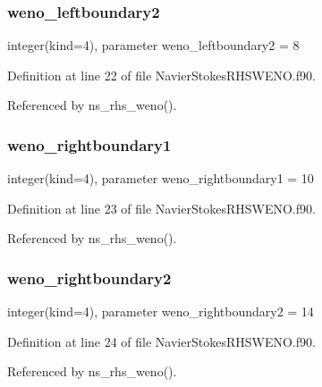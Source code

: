 \subsubsection{\texorpdfstring{weno\+\_\+leftboundary2}{weno\_leftboundary2}}
{\footnotesize\ttfamily integer(kind=4), parameter weno\+\_\+leftboundary2 = 8}



Definition at line 22 of file Navier\+Stokes\+R\+H\+S\+W\+E\+N\+O.\+f90.



Referenced by ns\+\_\+rhs\+\_\+weno().

\hypertarget{namespacenavierstokesrhsweno_a5f3396ae1256ba3e5cbf718cbf261618}{}\label{namespacenavierstokesrhsweno_a5f3396ae1256ba3e5cbf718cbf261618} 
\subsubsection{\texorpdfstring{weno\+\_\+rightboundary1}{weno\_rightboundary1}}
{\footnotesize\ttfamily integer(kind=4), parameter weno\+\_\+rightboundary1 = 10}



Definition at line 23 of file Navier\+Stokes\+R\+H\+S\+W\+E\+N\+O.\+f90.



Referenced by ns\+\_\+rhs\+\_\+weno().

\hypertarget{namespacenavierstokesrhsweno_aedc66bac095d9c04f800491a6a77de56}{}\label{namespacenavierstokesrhsweno_aedc66bac095d9c04f800491a6a77de56} 
\subsubsection{\texorpdfstring{weno\+\_\+rightboundary2}{weno\_rightboundary2}}
{\footnotesize\ttfamily integer(kind=4), parameter weno\+\_\+rightboundary2 = 14}



Definition at line 24 of file Navier\+Stokes\+R\+H\+S\+W\+E\+N\+O.\+f90.



Referenced by ns\+\_\+rhs\+\_\+weno().

